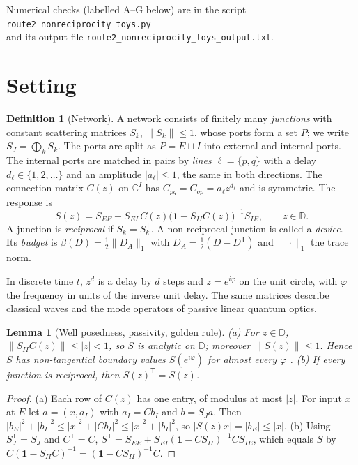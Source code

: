 \documentclass[11pt]{article}
\newtheorem{lemma}[theorem]{Lemma}
\theoremstyle{definition}
\newtheorem{definition}{Definition}
\theoremstyle{remark}
\newcommand{\D}{\mathbb D}
\newcommand{\one}{\mathbf 1}
\newcommand{\T}{\mathsf T}
\begin{document}
Numerical checks (labelled A--G below) are in the script \texttt{route2\_nonreciprocity\_toys.py}\\ and its output file \texttt{route2\_nonreciprocity\_toys\_output.txt}.

\section{Setting}

\begin{definition}[Network]\label{def:net}
A network consists of finitely many \emph{junctions} with constant scattering matrices $S_k$, $\|S_k\|\le1$, whose ports form a set $P$; we write $S_J=\bigoplus_kS_k$. The ports are split as $P=E\sqcup I$ into external and internal ports. The internal ports are matched in pairs by \emph{lines} $\ell=\{p,q\}$ with a delay $d_\ell\in\{1,2,\dots\}$ and an amplitude $|a_\ell|\le1$, the same in both directions. The connection matrix $C(z)$ on $\mathbb C^I$ has $C_{pq}=C_{qp}=a_\ell z^{d_\ell}$ and is symmetric. The response is
\[
S(z)=S_{EE}+S_{EI}\,C(z)\bigl(\one-S_{II}C(z)\bigr)^{-1}S_{IE},\qquad z\in\D .
\]
A junction is \emph{reciprocal} if $S_k=S_k^\T$. A non-reciprocal junction is called a \emph{device}. Its \emph{budget} is $\beta(D)=\frac12\|D_A\|_1$ with $D_A=\frac12(D-D^\T)$ and $\|\cdot\|_1$ the trace norm.
\end{definition}

In discrete time $t$, $z^d$ is a delay by $d$ steps and $z=e^{i\varphi}$ on the unit circle, with $\varphi$ the frequency in units of the inverse unit delay. The same matrices describe classical waves and the mode operators of passive linear quantum optics.

\begin{lemma}[Well posedness, passivity, golden rule]\label{lem:wellposed}
(a) For $z\in\D$, $\|S_{II}C(z)\|\le|z|<1$, so $S$ is analytic on $\D$; moreover $\|S(z)\|\le1$. Hence $S$ has non-tangential boundary values $S(e^{i\varphi})$ for almost every $\varphi$ \cite{Gar07}.
(b) If every junction is reciprocal, then $S(z)^\T=S(z)$.
\end{lemma}
\begin{proof}
(a) Each row of $C(z)$ has one entry, of modulus at most $|z|$. For input $x$ at $E$ let $a=(x,a_I)$ with $a_I=Cb_I$ and $b=S_Ja$. Then $|b_E|^2+|b_I|^2\le|x|^2+|Cb_I|^2\le|x|^2+|b_I|^2$, so $|S(z)x|=|b_E|\le|x|$.
(b) Using $S_J^\T=S_J$ and $C^\T=C$, $S^\T=S_{EE}+S_{EI}(\one-CS_{II})^{-1}CS_{IE}$, which equals $S$ by $C(\one-S_{II}C)^{-1}=(\one-CS_{II})^{-1}C$.
\end{proof}
\end{document}
